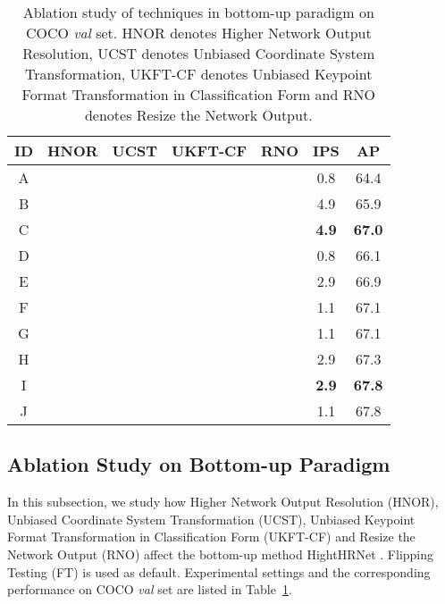 \documentclass[10pt,journal,compsoc]{IEEEtran}
\begin{document}
\begin{table}[h]
\footnotesize
\caption{Ablation study of techniques in bottom-up paradigm on COCO \textit{val} set. HNOR denotes Higher Network Output Resolution, UCST denotes Unbiased Coordinate System Transformation, UKFT-CF denotes Unbiased Keypoint Format Transformation in Classification Form and RNO denotes Resize the Network Output.}
\begin{center}
\begin{tabular}{c|c|c|c|c|c|c}

\hline
ID      &HNOR           &UCST           &UKFT-CF        &RNO            &IPS            &AP    \\
\hline
A       &               &               &               &   &0.8            &64.4 \\
B       &               &   &               &               &4.9            &65.9 \\
C       &               &   &   &               &\textbf{4.9}   &\textbf{67.0} \\
D       &               &   &   &   &0.8            &66.1 \\
\hline
E       &   &               &               &               &2.9            &66.9 \\
F       &   &               &               &   &1.1            &67.1 \\
G       &   &               &   &   &1.1            &67.1 \\
H       &   &   &               &               &2.9            &67.3 \\
I       &   &   &   &               &\textbf{2.9}   &\textbf{67.8} \\
J       &   &   &   &   &1.1            &67.8 \\
\hline
\end{tabular}
\end{center}
\label{tab:ablation_bottom_up}
\end{table}



\subsection{Ablation Study on Bottom-up Paradigm}
In this subsection, we study how Higher Network Output Resolution (HNOR), Unbiased Coordinate System Transformation (UCST), Unbiased Keypoint Format Transformation in Classification Form (UKFT-CF) and Resize the Network Output (RNO) affect the bottom-up method HightHRNet \cite{Higher}. Flipping Testing (FT) is used as default. Experimental settings and the corresponding performance on COCO \textit{val} set are listed in Table~\ref{tab:ablation_bottom_up}.
\end{document}
